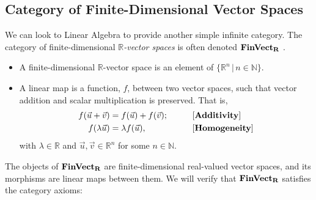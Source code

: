 \subsection{Category of Finite-Dimensional Vector Spaces}

We can look to Linear Algebra to provide another simple infinite category. The
category of finite-dimensional $\mathbb{R}$\emph{-vector spaces} is often denoted
$\operatorname{\mathbf{FinVect}_\mathbf{R}}$ \autocite{Hasegawa:2008}.
\begin{itemize}
        \item A finite-dimensional $\mathbb{R}$-vector space is an element of
                $\{ \mathbb{R} ^n \, | \, n \in \mathbb{N} \}$.
        \item A linear map is a function, $f$, between two vector spaces,
                such that vector addition and scalar multiplication is
                preserved. That is,
                \begin{alignat}{2}
                        f( \vec{u} + \vec{v} ) &= f( \vec{u} ) + f( \vec{v} );
                        \qquad && \text{[\textbf{Additivity}]}%
                                \label{eqn:vs-additivity}\\
                        f( \lambda \vec{u} ) &= \lambda f( \vec{u} ),
                        \qquad && \text{[\textbf{Homogeneity}]}%
                                \label{eqn:vs-homo}
                \end{alignat}
                with $\lambda \in \mathbb{R}$ and
                $\vec{u},\vec{v} \in \mathbb{R} ^n$ for some $n \in \mathbb{N}$.
\end{itemize}
The objects of $\operatorname{\mathbf{FinVect}_\mathbf{R}}$ are finite-dimensional real-valued vector spaces, and
its morphisms are linear maps between them. We will verify that $\operatorname{\mathbf{FinVect}_\mathbf{R}}$
satisfies the category axioms:
